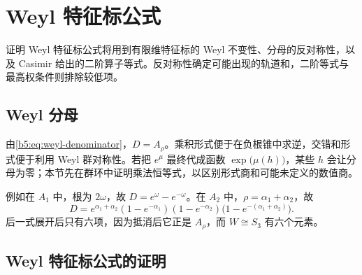 %
%

\section{Weyl 特征标公式}
\label{b5:sec:1904}

证明 Weyl 特征标公式将用到有限维特征标的 Weyl 不变性、分母的反对称性，以及 Casimir 给出的二阶算子等式。反对称性确定可能出现的轨道和，二阶等式与最高权条件则排除较低项。

\subsection{Weyl 分母}
\label{b5:subsec:1904:01}

由\eqref{b5:eq:weyl-denominator}，\(D=A_\rho\)。乘积形式便于在负根锥中求逆，交错和形式便于利用 Weyl 群对称性。若把 \(e^\mu\) 最终代成函数 \(\exp\bigl(\mu(h)\bigr)\)，某些 \(h\) 会让分母为零；本节先在群环中证明乘法恒等式，以区别形式商和可能未定义的数值商。

\ProseParagraphBreak

例如在 \(A_1\) 中，根为 \(2\omega\)，故 \(D=e^\omega-e^{-\omega}\)。在 \(A_2\) 中，\(\rho=\alpha_1+\alpha_2\)，故
\[
	D=e^{\alpha_1+\alpha_2} (1-e^{-\alpha_1})(1-e^{-\alpha_2}) \bigl(1-e^{-(\alpha_1+\alpha_2)}\bigr).
\]
后一式展开后只有六项，因为抵消后它正是 \(A_\rho\)，而 \(W\cong S_3\) 有六个元素。

\subsection{Weyl 特征标公式的证明}
\label{b5:subsec:1904:02}

